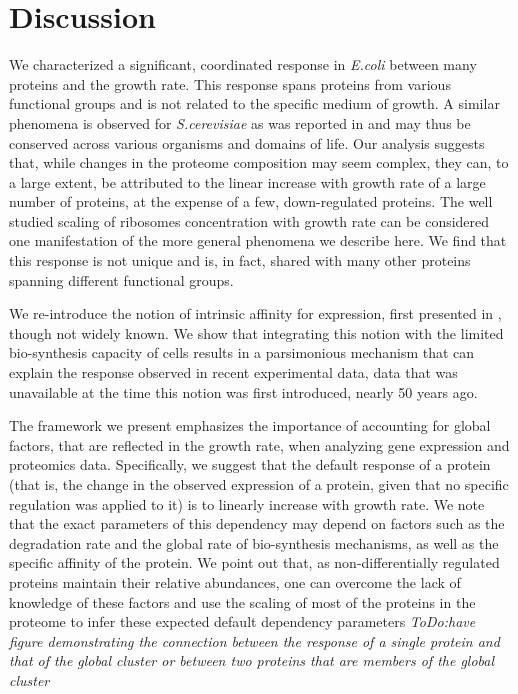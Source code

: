 \documentclass[notitlepage]{article}
\begin{document}
\section{Discussion}
We characterized a significant, coordinated response in \emph{E.coli} between many proteins and the growth rate.
This response spans proteins from various functional groups and is not related to the specific medium of growth.
A similar phenomena is observed for \emph{S.cerevisiae} as was reported in \parencite{Keren2013a} and may thus be conserved across various organisms and domains of life.
Our analysis suggests that, while changes in the proteome composition may seem complex, they can, to a large extent, be attributed to the linear increase with growth rate of a large number of proteins, at the expense of a few, down-regulated proteins.
The well studied scaling of ribosomes concentration with growth rate can be considered one manifestation of the more general phenomena we describe here.
We find that this response is not unique and is, in fact, shared with many other proteins spanning different functional groups.

We re-introduce the notion of intrinsic affinity for expression, first presented in \parencite{Maaloe1969}, though not widely known.
We show that integrating this notion with the limited bio-synthesis capacity of cells results in a parsimonious mechanism that can explain the response observed in recent experimental data, data that was unavailable at the time this notion was first introduced, nearly 50 years ago.

The framework we present emphasizes the importance of accounting for global factors, that are reflected in the growth rate, when analyzing gene expression and proteomics data.
Specifically, we suggest that the default response of a protein (that is, the change in the observed expression of a protein, given that no specific regulation was applied to it) is to linearly increase with growth rate.
We note that the exact parameters of this dependency may depend on factors such as the degradation rate and the global rate of bio-synthesis mechanisms, as well as the specific affinity of the protein.
We point out that, as non-differentially regulated proteins maintain their relative abundances, one can overcome the lack of knowledge of these factors and use the scaling of most of the proteins in the proteome to infer these expected default dependency parameters \emph{ToDo:have figure demonstrating the connection between the response of a single protein and that of the global cluster or between two proteins that are members of the global cluster}
\end{document}
